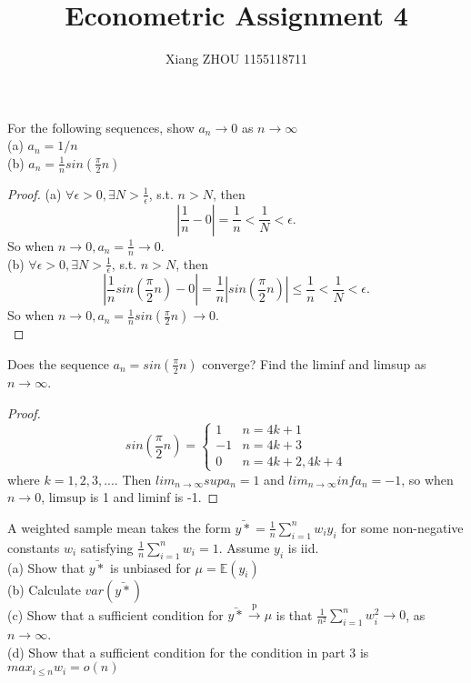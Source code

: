 \documentclass[12pt]{article}
\newenvironment{question}[2][Question]{\begin{trivlist}
\item[\hskip \labelsep {\bfseries #1}\hskip \labelsep {\bfseries #2.}]}{\end{trivlist}}
\begin{document}
 
\title{Econometric Assignment 4}
\author{Xiang ZHOU 1155118711}
\maketitle
 
\begin{question}{6.1}
For the following sequences, show $a_n \to 0$ as $n \to \infty$\\
(a) $a_n = 1/n$\\
(b) $a_n = \frac{1}{n}sin(\frac{\pi}{2}n)$
\end{question}

\begin{proof}
(a) $\forall \epsilon >0,\exists N>\frac{1}{\epsilon}$, s.t. $n>N$, then
$$|\frac{1}{n}-0| = \frac{1}{n}<\frac{1}{N}<\epsilon.$$
So when $n\to 0, a_n = \frac{1}{n}\to 0.$\\
(b) $\forall \epsilon >0,\exists N>\frac{1}{\epsilon}$, s.t. $n>N$, then
$$|\frac{1}{n}sin(\frac{\pi}{2}n)-0| = \frac{1}{n}|sin(\frac{\pi}{2}n)|\le \frac{1}{n}<\frac{1}{N}<\epsilon.$$
So when $n\to 0, a_n = \frac{1}{n}sin(\frac{\pi}{2}n)\to 0.$\\
\end{proof}

\begin{question}{6.2}
Does the sequence $a_n = sin(\frac{\pi}{2}n)$ converge? Find the liminf and limsup as $n\to \infty$.
\end{question}

\begin{proof}
 \[
    sin(\frac{\pi}{2}n)=\left\{
                \begin{array}{rl}
                 1& n = 4k+1\\
                 -1&n = 4k+3\\
                 0 & n = 4k+2, 4k+4
                \end{array}
              \right.
  \] 
  where $k = 1,2,3,...$. Then $lim_{n\to \infty} sup a_n = 1$ and $lim_{n\to \infty} inf a_n = -1$, so when $n\to 0$, limsup is 1 and liminf is -1.
\end{proof}


\begin{question}{6.3}
A weighted sample mean takes the form $\bar{y*} = \frac{1}{n}\sum_{i = 1}^{n}w_iy_i$ for some non-negative constants $w_i$ satisfying $\frac{1}{n}\sum_{i = 1}^{n}w_i = 1$. Assume $y_i$ is iid.\\
(a) Show that $\bar{y*}$ is unbiased for $\mu = \mathbb{E}(y_i)$\\
(b) Calculate $var(\bar{y*})$\\
(c) Show that a sufficient condition for $\bar{y*}\xrightarrow{\text{p}}\mu$ is that $\frac{1}{n^2}\sum_{i = 1}^{n}w_i^2\to 0$, as $n \to \infty$.\\
(d) Show that a sufficient condition for the condition in part 3 is $max_{i\le n}w_i = o(n)$
\end{question}
\end{document}
